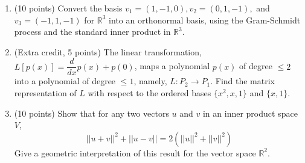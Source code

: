 \documentclass[fleqn]{article}
\begin{document}
\begin{enumerate}
    \item (10 points) Convert the basis $v_1=(1, -1, 0), v_2=(0, 1, -1),$ and $v_3=(-1, 1, -1)$ for $\mathbb{R}^3$ into
    an orthonormal basis, using the Gram-Schmidt process and the standard inner product in $\mathbb{R}^3$.


    \item (Extra credit, 5 points) The linear transformation, $L \left[p(x)\right]=\dfrac{d}{dx}p(x)+p(0)$, maps 
    a polynomial $p(x)$ of degree $\leq 2$  into a polynomial of degree $\leq 1$, namely, $L: P_2 \rightarrow P_1$.
    Find the matrix representation of $L$ with respect to the ordered bases $\{ x^2, x, 1\}$ and $\{ x, 1\}$.

    \item (10 points) Show that for any two vectors $u$ and $v$ in an inner product space $V$,
    $$||u+v||^2+||u-v||=2\left(||u||^2+||v||^2\right)$$
    Give a geometric interpretation of this result for the vector space $\mathbb{R}^2$.

  \end{enumerate}
\end{document}
